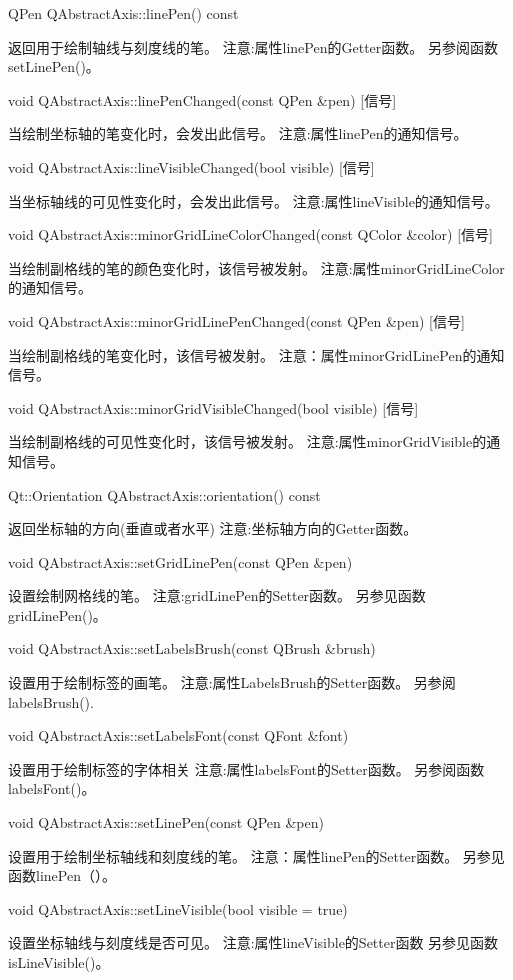 QPen QAbstractAxis::linePen() const 

返回用于绘制轴线与刻度线的笔。 注意:属性linePen的Getter函数。 另参阅函数setLinePen()。

void QAbstractAxis::linePenChanged(const QPen \&pen) [信号] 

当绘制坐标轴的笔变化时，会发出此信号。 注意:属性linePen的通知信号。

void QAbstractAxis::lineVisibleChanged(bool visible) [信号] 

当坐标轴线的可见性变化时，会发出此信号。 注意:属性lineVisible的通知信号。

void QAbstractAxis::minorGridLineColorChanged(const QColor \&color)
[信号]

 当绘制副格线的笔的颜色变化时，该信号被发射。 注意:属性minorGridLineColor的通知信号。

void QAbstractAxis::minorGridLinePenChanged(const QPen \&pen) [信号] 

当绘制副格线的笔变化时，该信号被发射。 注意：属性minorGridLinePen的通知信号。

void QAbstractAxis::minorGridVisibleChanged(bool visible) [信号] 

当绘制副格线的可见性变化时，该信号被发射。 注意:属性minorGridVisible的通知信号。

Qt::Orientation QAbstractAxis::orientation() const 

返回坐标轴的方向(垂直或者水平) 注意:坐标轴方向的Getter函数。

void QAbstractAxis::setGridLinePen(const QPen \&pen) 

设置绘制网格线的笔。 注意:gridLinePen的Setter函数。 另参见函数gridLinePen()。

void QAbstractAxis::setLabelsBrush(const QBrush \&brush)

 设置用于绘制标签的画笔。 注意:属性LabelsBrush的Setter函数。 另参阅labelsBrush().

void QAbstractAxis::setLabelsFont(const QFont \&font) 

设置用于绘制标签的字体相关 注意:属性labelsFont的Setter函数。 另参阅函数labelsFont()。

void QAbstractAxis::setLinePen(const QPen \&pen) 

设置用于绘制坐标轴线和刻度线的笔。 注意：属性linePen的Setter函数。 另参见函数linePen（）。

void QAbstractAxis::setLineVisible(bool visible = true) 

设置坐标轴线与刻度线是否可见。 注意:属性lineVisible的Setter函数 另参见函数isLineVisible()。

